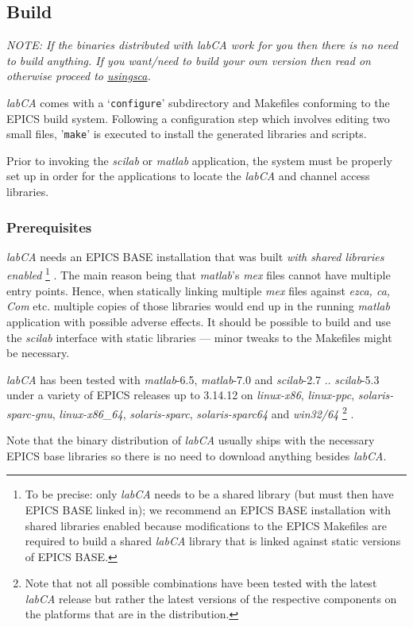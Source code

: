 \documentclass{article}
\newcommand{\sca}{\ita{labCA}}
\newcommand{\scilab}{\ita{scilab}}
\newcommand{\matlab}{\ita{matlab}}
\newcommand{\windoze}{\ita{win32/64}}
\newcommand{\com}[1]{{\tt #1}}
\newcommand{\ita}[1]{\emph{#1}}
\begin{document}
\subsection{Build}
{\em NOTE: If the binaries distributed with \sca{} work for you then there is
no need to build anything. If you want/need to build your own version then read on
otherwise proceed to \hyperref{Using \sca}{Subsection~}{}{usingsca}.}

\sca{} comes with a `\com{configure}' subdirectory and Makefiles conforming to the
EPICS build system. Following a configuration step which involves editing
two small files, '\com{make}' is executed to install the generated libraries
and scripts.

Prior to invoking the \scilab{} or \matlab{} application, the system
must be properly set up in order for the applications to locate the
\sca{} and channel access libraries.

\subsubsection{Prerequisites}
\sca{} needs an EPICS BASE installation that was built \ita{with shared
libraries enabled}%
\footnote{
To be precise: only \sca{} needs to be a shared library (but must then have
EPICS BASE linked in); we recommend an EPICS BASE installation with
shared libraries enabled because modifications to the EPICS Makefiles
are required to build a shared \sca{} library that is linked against
static versions of EPICS BASE.}%
.
The main reason being that \matlab's \ita{mex} files cannot
have multiple entry points. Hence, when statically linking multiple \ita{mex}
files against \ita{ezca, ca, Com} etc. multiple copies of those libraries
would end up in the running \matlab{} application with possible adverse
effects. It should be possible to build and use the \scilab{} interface
with static libraries --- minor tweaks to the Makefiles might be necessary.

\sca{} has been tested with \matlab-6.5, \matlab-7.0 and \scilab-2.7 .. \scilab-5.3
under a variety of EPICS releases up to 3.14.12 on \ita{linux-x86},
\ita{linux-ppc}, \ita{solaris-sparc-gnu},
\ita{linux-x86\_64}, \ita{solaris-sparc}, \ita{solaris-sparc64}
and \windoze%
\footnote{
Note that not all possible combinations have been tested with the latest \sca{} release
but rather the latest versions of the respective components on the platforms
that are in the distribution.}%
.

Note that the binary distribution of \sca{} usually ships with the
necessary EPICS base libraries so there is no need to download anything
besides \sca.
\end{document}

